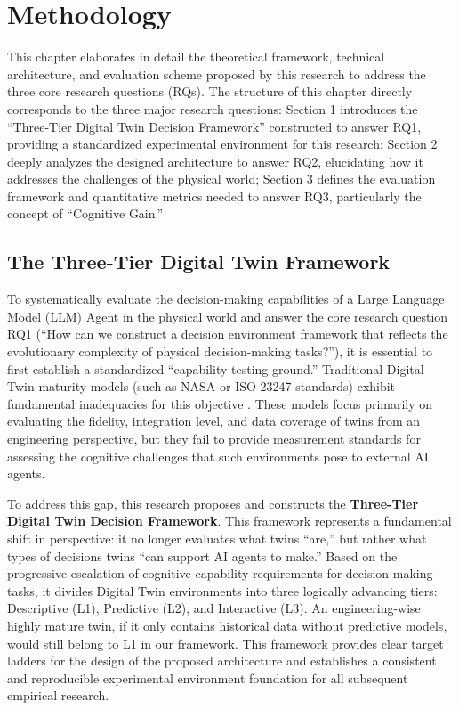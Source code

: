 
\chapter{Methodology} \label{chp:methodology}

This chapter elaborates in detail the theoretical framework, technical architecture, and evaluation scheme proposed by this research to address the three core research questions (RQs). The structure of this chapter directly corresponds to the three major research questions: Section 1 introduces the ``Three-Tier Digital Twin Decision Framework'' constructed to answer RQ1, providing a standardized experimental environment for this research; Section 2 deeply analyzes the designed architecture to answer RQ2, elucidating how it addresses the challenges of the physical world; Section 3 defines the evaluation framework and quantitative metrics needed to answer RQ3, particularly the concept of ``Cognitive Gain.''

\section{The Three-Tier Digital Twin Framework}

To systematically evaluate the decision-making capabilities of a Large Language Model (LLM) Agent in the physical world and answer the core research question RQ1 (``How can we construct a decision environment framework that reflects the evolutionary complexity of physical decision-making tasks?''), it is essential to first establish a standardized ``capability testing ground.'' Traditional Digital Twin maturity models (such as NASA or ISO 23247 standards) exhibit fundamental inadequacies for this objective \cite{glaessgen2012digital, ISO23247}. These models focus primarily on evaluating the fidelity, integration level, and data coverage of twins from an engineering perspective, but they fail to provide measurement standards for assessing the cognitive challenges that such environments pose to external AI agents.

To address this gap, this research proposes and constructs the \textbf{Three-Tier Digital Twin Decision Framework}. This framework represents a fundamental shift in perspective: it no longer evaluates what twins ``are,'' but rather what types of decisions twins ``can support AI agents to make.'' Based on the progressive escalation of cognitive capability requirements for decision-making tasks, it divides Digital Twin environments into three logically advancing tiers: Descriptive (L1), Predictive (L2), and Interactive (L3). An engineering-wise highly mature twin, if it only contains historical data without predictive models, would still belong to L1 in our framework. This framework provides clear target ladders for the design of the proposed architecture and establishes a consistent and reproducible experimental environment foundation for all subsequent empirical research.

